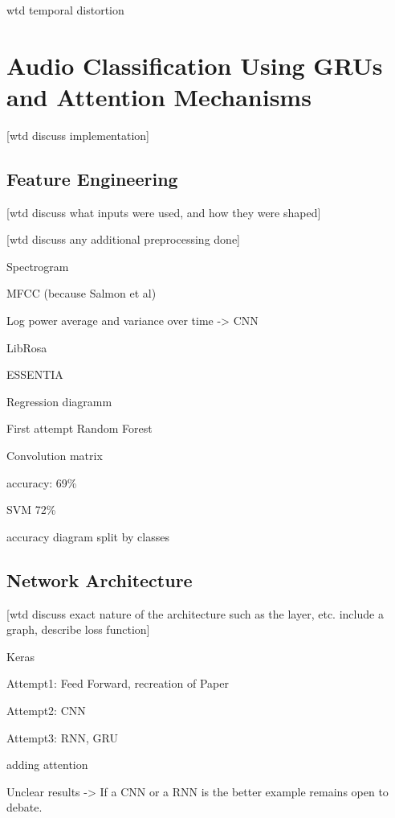 wtd temporal distortion






\chapter{Audio Classification Using GRUs and Attention Mechanisms}

[wtd discuss implementation]

\section{Feature Engineering}

[wtd discuss what inputs were used, and how they were shaped]

[wtd discuss any additional preprocessing done]

Spectrogram

MFCC (because Salmon et al) 

Log power average and variance over time -> CNN

LibRosa 

ESSENTIA




\newpage

Regression diagramm

First attempt Random Forest

Convolution matrix

accuracy: 69\%

SVM 72\%

accuracy diagram split by classes

\section{Network Architecture}

[wtd discuss exact nature of the architecture such as the layer, etc. include a graph, describe loss function]

Keras 

Attempt1: Feed Forward, recreation of Paper

Attempt2: CNN

Attempt3: RNN, GRU

adding attention


Unclear results -> If a CNN or a RNN is the better example remains open to debate.

